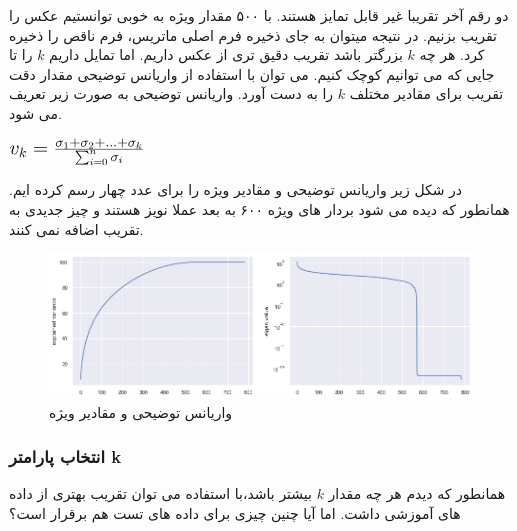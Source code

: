  	دو رقم آخر تقریبا غیر قابل تمایز هستند. با ۵۰۰ مقدار ویژه به خوبی توانستیم عکس را تقریب بزنیم. در نتیجه میتوان به جای ذخیره فرم اصلی ماتریس، فرم ناقص را ذخیره کرد.
 	هر چه $ k $ بزرگتر باشد تقریب دقیق تری از عکس داریم. اما تمایل داریم $ k $ را تا جایی که می توانیم کوچک کنیم. 
 	می توان با استفاده از واریانس توضیحی  مقدار دقت تقریب برای مقادیر مختلف $ k $ را به دست آورد. واریانس توضیحی به صورت زیر تعریف می شود.\\[5pt]
 	\begin{center}
 		$ \mbox{\Large \(%
 			v_k = \frac{\sigma_1 + \sigma_2 + \ldots + \sigma_k } {\sum_{i=0}^n \sigma_i} \) } $ 
 		\\[20pt]	
 	\end{center}
 	
 	در شکل زیر واریانس توضیحی و مقادیر ویژه را برای عدد چهار رسم کرده ایم. همانطور که دیده می شود بردار های ویژه ۶۰۰ به بعد عملا نویز هستند و چیز جدیدی به تقریب اضافه نمی کنند. \\[5pt]
 	\begin{figure}[h]
 		\centering
 		\includegraphics[width=\linewidth]{assets/explained_variance.png}
 		\caption{واریانس توضیحی و مقادیر ویژه}
 	\end{figure}
 	
 	
 	\pagebreak
 	\subsubsection{انتخاب پارامتر k}
 	همانطور که دیدم هر چه مقدار $ k $ بیشتر باشد،‌با استفاده می توان تقریب بهتری از داده های آموزشی داشت. اما آیا چنین چیزی برای داده های تست هم برقرار است؟ 
 	 	 
